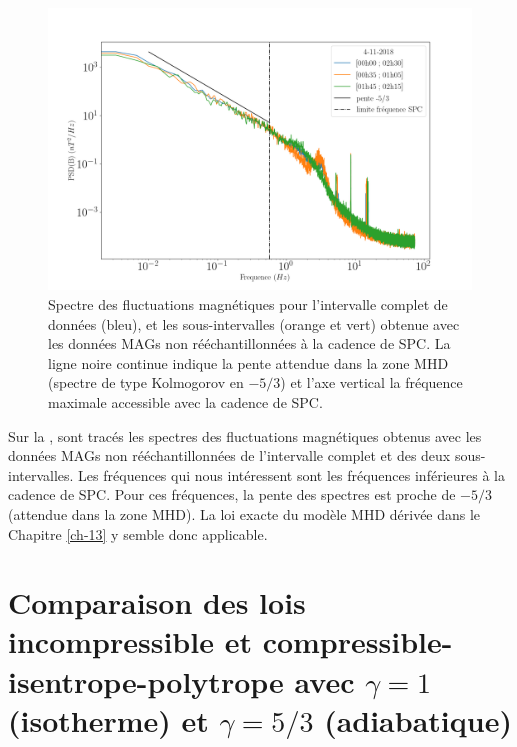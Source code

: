 \begin{figure}[!ht]
 \centering
\includegraphics[width=\linewidth,trim=0cm 0cm 0cm 0cm, clip=false]{./Part_1/images/Fourier2}
\caption{Spectre des fluctuations magnétiques pour l'intervalle complet de données (bleu), et les sous-intervalles (orange et vert) obtenue avec les données \acs{MAGs} non rééchantillonnées à la cadence de \acs{SPC}. La ligne noire continue indique la pente attendue dans la zone MHD (spectre de type Kolmogorov en $-5/3$) et l'axe vertical la fréquence maximale accessible avec la cadence de \acs{SPC}.}
\label{fig:spec_PSP}
\end{figure}

Sur la , sont tracés les spectres des fluctuations magnétiques obtenus avec les données \acs{MAGs} non rééchantillonnées de l'intervalle complet et des deux sous-intervalles. Les fréquences qui nous intéressent sont les fréquences inférieures à la cadence de \acs{SPC}. Pour ces fréquences, la pente des spectres est proche de $-5/3$ (attendue dans la zone MHD). La loi exacte du modèle MHD dérivée dans le Chapitre \ref{ch-13} y semble donc applicable. 

\section{Comparaison des lois incompressible et compressible-isentrope-polytrope avec $\gamma = 1$ (isotherme) et $\gamma = 5/3$ (adiabatique)}
\label{sec-142}

